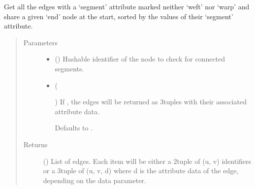 \documentclass[letterpaper,10pt,english]{sphinxmanual}
\begin{document}
\begin{fulllineitems}
\begin{fulllineitems}
\label{\detokenize{cockatoo:cockatoo.KnitNetworkBase.end_node_segments_by_start}}
Get all the edges with a ‘segment’ attribute marked neither ‘weft’ nor
‘warp’ and share a given ‘end’ node at the start, sorted by the values
of their ‘segment’ attribute.
\begin{quote}\begin{description}
\item[{Parameters}] \leavevmode\begin{itemize}
\item {} 
 () \textendash{} Hashable identifier of the node to check for connected segments.

\item {} 
 (%
\begin{footnote}[85]\sphinxAtStartFootnote
{}
%
\end{footnote}\sphinxstyleliteralemphasis{\sphinxupquote{, }}) \textendash{} 
If , the edges will be returned as 3\sphinxhyphen{}tuples with their
associated attribute data.

Defaults to .


\end{itemize}

\item[{Returns}] \leavevmode
{} () \textendash{} List of edges. Each item will be either a 2\sphinxhyphen{}tuple of (u, v)
identifiers or a 3\sphinxhyphen{}tuple of (u, v, d) where d is the attribute data
of the edge, depending on the data parameter.

\end{description}\end{quote}

\end{fulllineitems}



\end{fulllineitems}
\end{document}
